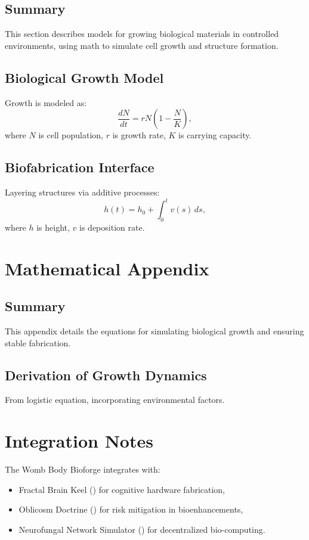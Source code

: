 \documentclass[11pt,oneside]{memoir}
\theoremstyle{plain}
\begin{document}
\subsection{Summary}
This section describes models for growing biological materials in controlled environments, using math to simulate cell growth and structure formation.

\subsection{Biological Growth Model}
Growth is modeled as:
\begin{equation}
    \frac{dN}{dt} = r N \left(1 - \frac{N}{K}\right),
\end{equation}
where \(N\) is cell population, \(r\) is growth rate, \(K\) is carrying capacity.

\subsection{Biofabrication Interface}
Layering structures via additive processes:
\begin{equation}
    h(t) = h_0 + \int_0^t v(s) \, ds,
\end{equation}
where \(h\) is height, \(v\) is deposition rate.

\section{Mathematical Appendix}
\subsection{Summary}
This appendix details the equations for simulating biological growth and ensuring stable fabrication.

\subsection{Derivation of Growth Dynamics}
From logistic equation, incorporating environmental factors.

\section{Integration Notes}
The Womb Body Bioforge integrates with:
\begin{itemize}
    \item Fractal Brain Keel () for cognitive hardware fabrication,
    \item Oblicosm Doctrine () for risk mitigation in bioenhancements,
    \item Neurofungal Network Simulator () for decentralized bio-computing.
\end{itemize}
\end{document}

